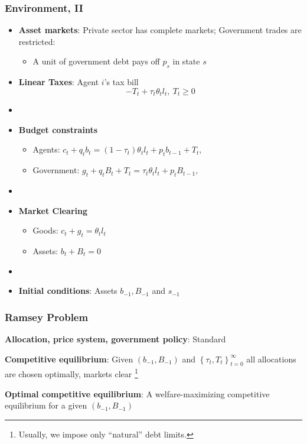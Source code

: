 \documentclass{beamer}
\begin{document}
\begin{frame}
 \frametitle{Environment, II}
 \begin{itemize}
\item \textbf{Asset markets}: Private sector has complete markets; Government trades are restricted:
\begin{itemize}
	\item  A unit of government debt  pays off $p_s$ in state $s$
\end{itemize}
  \item \textbf{Linear Taxes}: Agent $i$'s tax bill
\[- T_t + \tau_t \theta_{t}l_{t},  \ T_t \geq 0 \]

\item[]
  \item \textbf{Budget constraints}
  \begin{itemize}
   \item Agents: $ c_{t}+q_tb_{t}=\left( 1-\tau _{t}\right) \theta _{t}l_{t}+p_{t}b_{t-1}+T_{t},$ %
  \item Government: $g_{t}+q_tB_{t}+T_t=\tau _{t}\theta_{t}l_{t}+p_{t}B_{t-1}, $%
  \end{itemize}

\item[]
  \item \textbf{Market Clearing}
  \begin{itemize}
   \item Goods: $c_{t}+g_t = \theta _{t} l_{t}$

   \item Assets: $b_{t}+B_{t}=0$
\end{itemize}
  \item[]

\item \textbf{Initial conditions}: Assets $b_{-1}, B_{-1}$ and  $s_{-1}$
\end{itemize}

\end{frame}


\begin{frame}
 \frametitle{Ramsey Problem}

\begin{definition}
\textbf{Allocation, price system, government policy}: Standard

\end{definition}

\begin{definition}
\textbf{Competitive equilibrium}: Given $\left(b_{-1},B_{-1}\right) $ and $\left\{ \tau _{t},T_{t}\right\} _{t=0}^{\infty }$
all allocations are chosen optimally, markets clear \footnote{Usually, we impose only  ``natural'' debt limits. }
\end{definition}

\begin{definition}
\textbf{Optimal competitive equilibrium}: A welfare-maximizing competitive
equilibrium for a given $\left( b_{-1},B_{-1}\right) $
\end{definition}

 \end{frame}
\end{document}
